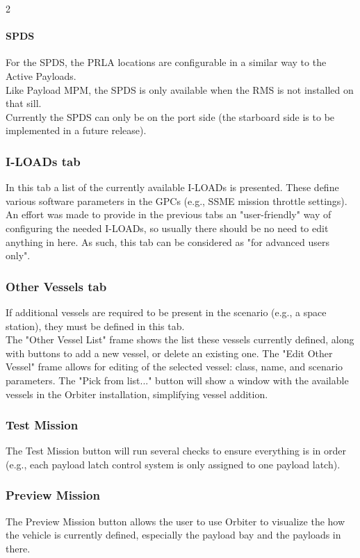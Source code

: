 \documentclass[Space_Shuttle_Vessel_Manual.tex]{subfiles}
\begin{document}
\begin{multicols*}{2}
\paragraph{SPDS}
For the SPDS, the PRLA locations are configurable in a similar way to the Active Payloads.\\
Like Payload MPM, the SPDS is only available when the RMS is not installed on that sill.\\
Currently the SPDS can only be on the port side (the starboard side is to be implemented in a future release).


\subsubsection{I-LOADs tab}
In this tab a list of the currently available I-LOADs is presented. These define various software parameters in the GPCs (e.g., SSME mission throttle settings).\\
An effort was made to provide in the previous tabs an "user-friendly" way of configuring the needed I-LOADs, so usually there should be no need to edit anything in here. As such, this tab can be considered as "for advanced users only".


\subsubsection{Other Vessels tab}
If additional vessels are required to be present in the scenario (e.g., a space station), they must be defined in this tab.\\
The "Other Vessel List" frame shows the list these vessels currently defined, along with buttons to add a new vessel, or delete an existing one. The "Edit Other Vessel" frame allows for editing of the selected vessel: class, name, and scenario parameters. The "Pick from list..." button will show a window with the available vessels in the Orbiter installation, simplifying vessel addition.


\subsubsection{Test Mission}
The Test Mission button will run several checks to ensure everything is in order (e.g., each payload latch control system is only assigned to one payload latch).


\subsubsection{Preview Mission}
\label{ssec:preview_mission}
The Preview Mission button allows the user to use Orbiter to visualize the how the vehicle is currently defined, especially the payload bay and the payloads in there.


\end{multicols*}
\end{document}
